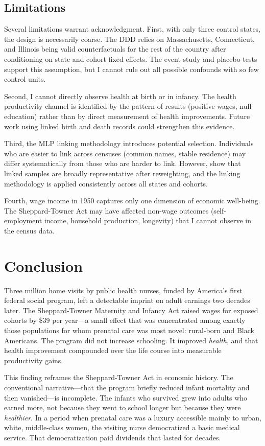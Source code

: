 \documentclass[12pt]{article}
\begin{document}
\subsection{Limitations}

Several limitations warrant acknowledgment. First, with only three control states, the design is necessarily coarse. The DDD relies on Massachusetts, Connecticut, and Illinois being valid counterfactuals for the rest of the country after conditioning on state and cohort fixed effects. The event study and placebo tests support this assumption, but I cannot rule out all possible confounds with so few control units.

Second, I cannot directly observe health at birth or in infancy. The health productivity channel is identified by the pattern of results (positive wages, null education) rather than by direct measurement of health improvements. Future work using linked birth and death records could strengthen this evidence.

Third, the MLP linking methodology introduces potential selection. Individuals who are easier to link across censuses (common names, stable residence) may differ systematically from those who are harder to link. However, \citet{abramitzkyboustan2017} show that linked samples are broadly representative after reweighting, and the linking methodology is applied consistently across all states and cohorts.

Fourth, wage income in 1950 captures only one dimension of economic well-being. The Sheppard-Towner Act may have affected non-wage outcomes (self-employment income, household production, longevity) that I cannot observe in the census data.


\section{Conclusion}

Three million home visits by public health nurses, funded by America's first federal social program, left a detectable imprint on adult earnings two decades later. The Sheppard-Towner Maternity and Infancy Act raised wages for exposed cohorts by \$39 per year---a small effect that was concentrated among exactly those populations for whom prenatal care was most novel: rural-born and Black Americans. The program did not increase schooling. It improved \textit{health}, and that health improvement compounded over the life course into measurable productivity gains.

This finding reframes the Sheppard-Towner Act in economic history. The conventional narrative---that the program briefly reduced infant mortality and then vanished---is incomplete. The infants who survived grew into adults who earned more, not because they went to school longer but because they were \textit{healthier}. In a period when prenatal care was a luxury accessible mainly to urban, white, middle-class women, the visiting nurse democratized a basic medical service. That democratization paid dividends that lasted for decades.
\end{document}
